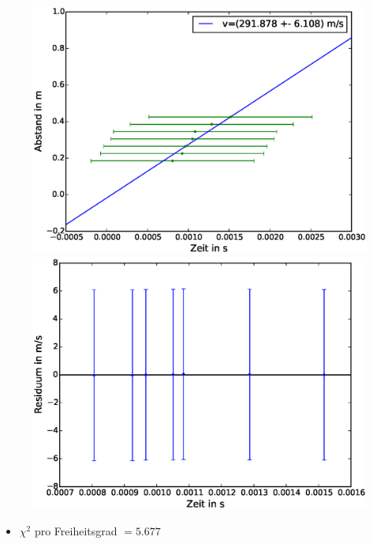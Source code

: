 \documentclass[11pt]{beamer}
\begin{document}
\begin{frame}
\begin{figure}[H]
\includegraphics[scale=0.3]{Bilder/Linreg-Laufzeit.eps}
\includegraphics[scale=0.3]{Bilder/Residuen-Laufzeit.eps}
\end{figure}
\begin{itemize}
\item $\chi^2$ pro Freiheitsgrad $=5.677$
\end{itemize}
\end{frame}
\end{document}
